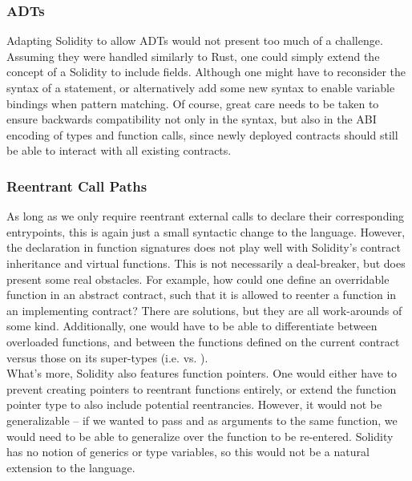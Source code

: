 \subsubsection{ADTs}
Adapting Solidity to allow ADTs would not present too much of a challenge. Assuming they were handled similarly to Rust, one could simply extend the concept of a Solidity  to include fields. Although one might have to reconsider the syntax of a  statement, or alternatively add some new syntax to enable variable bindings when pattern matching. Of course, great care needs to be taken to ensure backwards compatibility not only in the syntax, but also in the ABI encoding of types and function calls, since newly deployed contracts should still be able to interact with all existing contracts.

\subsubsection{Reentrant Call Paths}
As long as we only require reentrant external calls to declare their corresponding entrypoints, this is again just a small syntactic change to the language. However, the  declaration in function signatures does not play well with Solidity's contract inheritance and virtual functions. This is not necessarily a deal-breaker, but does present some real obstacles. For example, how could one define an overridable function in an abstract contract, such that it is allowed to reenter a function in an implementing contract? There are solutions, but they are all work-arounds of some kind. Additionally, one would have to be able to differentiate between overloaded functions, and between the functions defined on the current contract versus those on its super-types (i.e.  vs. ). \\
What's more, Solidity also features function pointers. One would either have to prevent creating pointers to reentrant functions entirely, or extend the function pointer type to also include potential reentrancies. However, it would not be generalizable -- if we wanted to pass  and  as arguments to the same function, we would need to be able to generalize over the function to be re-entered. Solidity has no notion of generics or type variables, so this would not be a natural extension to the language.

